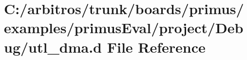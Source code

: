 \hypertarget{boards_2primus_2examples_2primus_eval_2project_2_debug_2utl__dma_8d}{\section{C\-:/arbitros/trunk/boards/primus/examples/primus\-Eval/project/\-Debug/utl\-\_\-dma.d File Reference}
\label{boards_2primus_2examples_2primus_eval_2project_2_debug_2utl__dma_8d}
}
